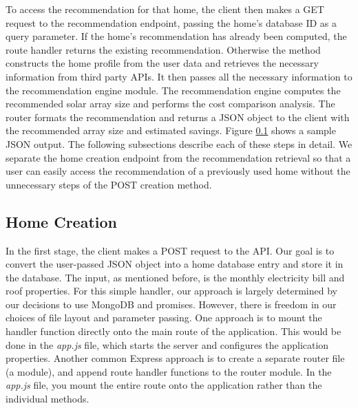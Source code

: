 \documentclass[pageno]{jpaper}
\begin{document}
To access the recommendation for that home, the client then makes a GET request to the recommendation endpoint, passing the home's database ID as a query parameter. If the home's recommendation has already been computed, the route handler returns the existing recommendation. Otherwise the method constructs the home profile from the user data and retrieves the necessary information from third party APIs. It then passes all the necessary information to the recommendation engine module. The recommendation engine computes the recommended solar array size and performs the cost comparison analysis. The router formats the recommendation and returns a JSON object to the client with the recommended array size and estimated savings. Figure \ref{} shows a sample JSON output. The following subsections describe each of these steps in detail. We separate the home creation endpoint from the recommendation retrieval so that a user can easily access the recommendation of a previously used home without the unnecessary steps of the POST creation method.

\subsection{Home Creation}
In the first stage, the client makes a POST request to the API. Our goal is to convert the user-passed JSON object into a home database entry and store it in the database. The input, as mentioned before, is the monthly electricity bill and roof properties. For this simple handler, our approach is largely determined by our decisions to use MongoDB and promises. However, there is freedom in our choices of file layout and parameter passing. One approach is to mount the handler function directly onto the main route of the application. This would be done in the {\em app.js} file, which starts the server and configures the application properties. Another common Express approach is to create a separate router file (a module), and append route handler functions to the router module. In the {\em app.js} file, you mount the entire route onto the application rather than the individual methods. 
\end{document}
